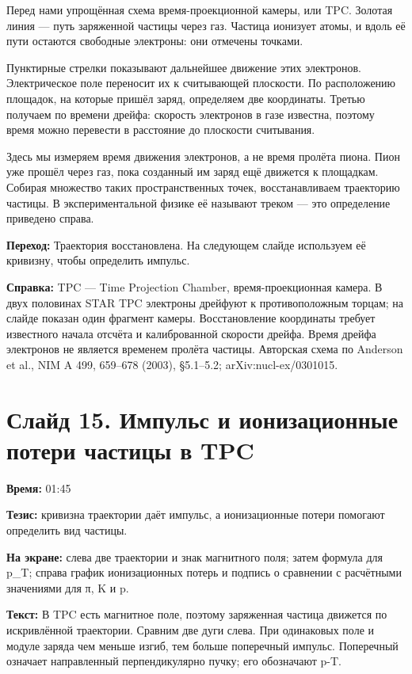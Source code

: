 \documentclass[11pt,a4paper]{article}
\begin{document}
Перед нами упрощённая схема время-проекционной камеры, или TPC. Золотая линия — путь заряженной частицы через газ. Частица ионизует атомы, и вдоль её пути остаются свободные электроны: они отмечены точками.

Пунктирные стрелки показывают дальнейшее движение этих электронов. Электрическое поле переносит их к считывающей плоскости. По расположению площадок, на которые пришёл заряд, определяем две координаты. Третью получаем по времени дрейфа: скорость электронов в газе известна, поэтому время можно перевести в расстояние до плоскости считывания.

Здесь мы измеряем время движения электронов, а не время пролёта пиона. Пион уже прошёл через газ, пока созданный им заряд ещё движется к площадкам. Собирая множество таких пространственных точек, восстанавливаем траекторию частицы. В экспериментальной физике её называют треком — это определение приведено справа.

\textbf{Переход:} Траектория восстановлена. На следующем слайде используем её кривизну, чтобы определить импульс.

\textbf{Справка:} TPC — Time Projection Chamber, время-проекционная камера. В двух половинах STAR TPC электроны дрейфуют к противоположным торцам; на слайде показан один фрагмент камеры. Восстановление координаты требует известного начала отсчёта и калиброванной скорости дрейфа. Время дрейфа электронов не является временем пролёта частицы. Авторская схема по Anderson et al., NIM A 499, 659–678 (2003), §5.1–5.2; arXiv:nucl-ex/0301015.

\clearpage
\section*{Слайд 15. Импульс и ионизационные потери частицы в TPC}
\textbf{Время:} 01:45

\textbf{Тезис:} кривизна траектории даёт импульс, а ионизационные потери помогают определить вид частицы.

\textbf{На экране:} слева две траектории и знак магнитного поля; затем формула для p\_T; справа график ионизационных потерь и подпись о сравнении с расчётными значениями для π, K и p.

\textbf{Текст:} В TPC есть магнитное поле, поэтому заряженная частица движется по искривлённой траектории. Сравним две дуги слева. При одинаковых поле и модуле заряда чем меньше изгиб, тем больше поперечный импульс. Поперечный означает направленный перпендикулярно пучку; его обозначают p-T.
\end{document}
